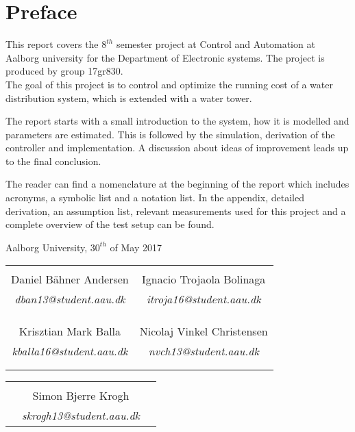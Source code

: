 \chapter*{Preface}

This report covers the $8^{th}$ semester project at Control and Automation at Aalborg university for the Department of Electronic systems. The project is produced by group 17gr830.\\
The goal of this project is to control and optimize the running cost of a water distribution system, which is extended with a water tower.  

The report starts with a small introduction to the system, how it is modelled and parameters are estimated. This is followed by the simulation, derivation of the controller and implementation. A discussion about ideas of improvement leads up to the final conclusion. 

The reader can find a nomenclature at the beginning of the report which includes acronyms, a symbolic list and a notation list. In the appendix, detailed derivation, an assumption list, relevant measurements used for this project and a complete overview of the test setup can be found.


\hfill Aalborg University, $30^{th}$ of May 2017




\vfill

\begin{table}[H]
	\centering
		\begin{tabular}{c c }
			\underline{\phantom{mmmmmmmmmmmmmmmmmmm}}       & \underline{\phantom{mmmmmmmmmmmmmmmmmmm}} \\
			Daniel Bähner Andersen			 & Ignacio Trojaola Bolinaga  \\
			\textit{dban13@student.aau.dk} & \textit{itroja16@student.aau.dk}\\
			&\\
			&\\
			\underline{\phantom{mmmmmmmmmmmmmmmmmmm}}       & \underline{\phantom{mmmmmmmmmmmmmmmmmmm}} \\
			Krisztian Mark Balla			 & Nicolaj Vinkel Christensen \\
			\textit{kballa16@student.aau.dk} & \textit{nvch13@student.aau.dk} \\
			&\\
			&\\	
		\end{tabular}
		\begin{tabular}{c c c}
			& \underline{\phantom{mmmmmmmmmmmmmmmmmmm}} 	& \\
			& Simon Bjerre Krogh					& \\
			& \textit{skrogh13@student.aau.dk}		& \\
		\end{tabular}
\end{table}